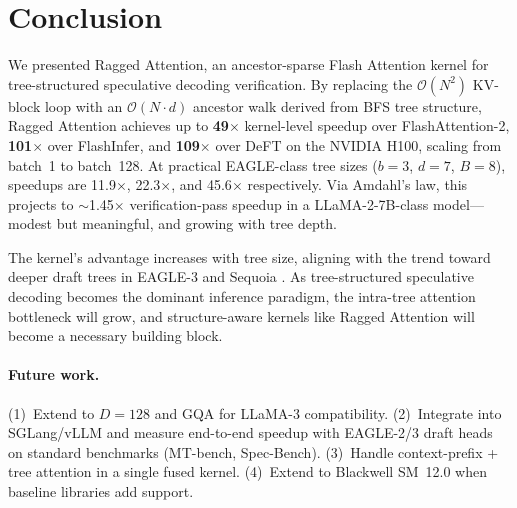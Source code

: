 \documentclass{article}
\newcommand{\method}{Ragged Attention}
\newcommand{\bigO}[1]{\mathcal{O}(#1)}
\newcommand{\depth}{d}
\newcommand{\branching}{b}
\newcommand{\headdim}{D}
\newcommand{\batchsize}{B}
\begin{document}
\section{Conclusion}\label{sec:conclusion}

We presented \method{}, an ancestor-sparse Flash Attention kernel
for tree-structured speculative decoding verification.
By replacing the $\bigO{N^2}$ KV-block loop with an
$\bigO{N \cdot \depth}$ ancestor walk derived from BFS tree structure,
\method{} achieves up to \textbf{49$\times$} kernel-level speedup
over FlashAttention-2, \textbf{101$\times$} over FlashInfer, and
\textbf{109$\times$} over DeFT on the NVIDIA H100, scaling from
batch~1 to batch~128.
At practical EAGLE-class tree sizes
($\branching = 3$, $\depth = 7$, $\batchsize = 8$), speedups are
11.9$\times$, 22.3$\times$, and 45.6$\times$ respectively.
Via Amdahl's law, this projects to $\sim$1.45$\times$ verification-pass
speedup in a LLaMA-2-7B-class model---modest but meaningful, and
growing with tree depth.

The kernel's advantage increases with tree size, aligning with the
trend toward deeper draft trees in EAGLE-3 \cite{li2025eagle3}
and Sequoia \cite{chen2024sequoia}.
As tree-structured speculative decoding becomes the dominant inference
paradigm, the intra-tree attention bottleneck will grow, and
structure-aware kernels like \method{} will become a necessary
building block.

\paragraph{Future work.}
(1)~Extend to $\headdim = 128$ and GQA for LLaMA-3 compatibility.
(2)~Integrate into SGLang/vLLM and measure end-to-end speedup
with EAGLE-2/3 draft heads on standard benchmarks (MT-bench,
Spec-Bench).
(3)~Handle context-prefix + tree attention in a single fused kernel.
(4)~Extend to Blackwell SM~12.0 when baseline libraries add support.


\end{document}
